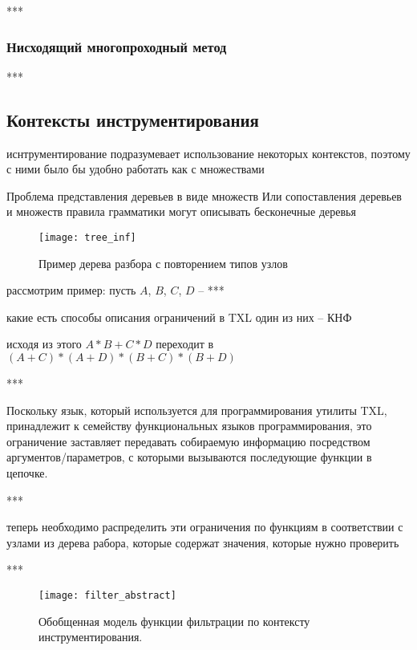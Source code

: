 ***

\subsubsection{Нисходящий многопроходный метод}

***

\subsection{Контексты инструментирования}

иснтрументирование подразумевает использование некоторых контекстов, поэтому с ними было бы удобно работать как с множествами

Проблема представления деревьев в виде множеств
Или сопоставления деревьев и множеств
правила грамматики могут описывать бесконечные деревья

\begin{figure}[H]
	\centering
	\texttt{[image: tree\_inf]}
	\caption{Пример дерева разбора с повторением типов узлов}
	\label{fig:tree_inf}
\end{figure}

рассмотрим пример: пусть $A$, $B$, $C$, $D$ -- ***

какие есть способы описания ограничений в TXL
один из них -- КНФ

исходя из этого
$A * B + C * D$
переходит в
$(A + C) * (A + D) * (B + C) * (B + D)$

***

Поскольку язык, который используется для программирования утилиты TXL, принадлежит к семейству функциональных языков программирования, это ограничение заставляет передавать собираемую информацию посредством аргументов/параметров, с которыми вызываются последующие функции в цепочке.

***

теперь необходимо распределить эти ограничения по функциям в соответствии с узлами из дерева рабора, которые содержат значения, которые нужно проверить

***

\begin{figure}[H]
	\centering
	\texttt{[image: filter\_abstract]}
	\caption{Обобщенная модель функции фильтрации по контексту инструментирования.}
	\label{fig:filter_abstract}
\end{figure}

